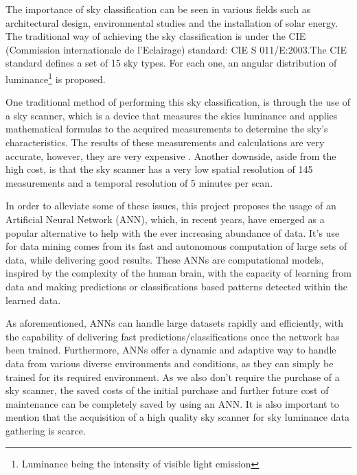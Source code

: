 The importance of sky classification can be seen in various fields such as architectural design\cite{LI2014563}\cite{ALSHAIBANI2017387}, environmental studies\cite{LI2001435} and the installation of solar energy\cite{kasht_2018}. The traditional way of achieving the sky classification is under the CIE (Commission internationale de l’Eclairage) standard: CIE S 011/E:2003\cite{CIE-Std}.The CIE standard defines a set of 15 sky types. For each one, an angular distribution of luminance\footnote{Luminance being the intensity of visible light emission} is proposed.

One traditional method of performing this sky classification, is through the use of a sky scanner, which is a device that measures the skies luminance and applies mathematical formulas to the acquired measurements to determine the sky's characteristics\cite{tregenza}.
The results of these measurements and calculations are very accurate, however, they are very expensive \cite{GARCIA2022147}. Another downside, aside from the high cost, is that the sky scanner has a very low spatial resolution of 145 measurements and a temporal resolution of 5 minutes per scan\cite{skyClassANN-Granados-Lopéz}.

In order to alleviate some of these issues, this project proposes the usage of an Artificial Neural Network (ANN), which, in recent years, have emerged as a popular alternative to help with the ever increasing abundance of data. It's use for data mining comes from its fast and autonomous computation of large sets of data, while delivering good results. These ANNs are computational models, inspired by the complexity of the human brain, with the capacity of learning from data and making predictions or classifications based patterns detected within the learned data. 

As aforementioned, ANNs can handle large datasets rapidly and efficiently, with the capability of delivering fast predictions/classifications once the network has been trained. Furthermore, ANNs offer a dynamic and adaptive way to handle data from various diverse environments and conditions, as they can simply be trained for its required environment. As we also don't require the purchase of a sky scanner, the saved costs of the initial purchase and further future cost of maintenance can be completely saved by using an ANN. It is also important to mention that the acquisition of a high quality sky scanner for sky luminance data gathering is scarce\cite{skyClassANN-Granados-Lopéz}. 

